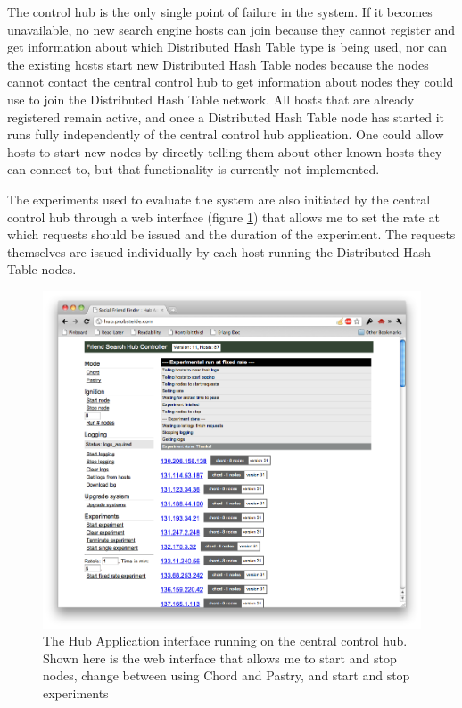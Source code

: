The control hub is the only single point of failure in the system. If it becomes unavailable, no new search engine hosts can join because they cannot register and get information about which Distributed Hash Table type is being used, nor can the existing hosts start new Distributed Hash Table nodes because the nodes cannot contact the central control hub to get information about nodes they could use to join the Distributed Hash Table network. All hosts that are already registered remain active, and once a Distributed Hash Table node has started it runs fully independently of the central control hub application.
One could allow hosts to start new nodes by directly telling them about other known hosts they can connect to, but that functionality is currently not implemented.

The experiments used to evaluate the system are also initiated by the central control hub through a web interface (figure \ref{figHubApp}) that allows me to set the rate at which requests should be issued and the duration of the experiment. The requests themselves are issued individually by each host running the Distributed Hash Table nodes.

\begin{figure}[!htb]
\begin{center}
	\includegraphics[width=0.9\linewidth]{illustrations/HubApp.png}
\caption{The Hub Application interface running on the central control hub. Shown here is the web interface that allows me to start and stop nodes, change between using Chord and Pastry, and start and stop experiments}
\label{figHubApp}
\end{center}
\end{figure}

